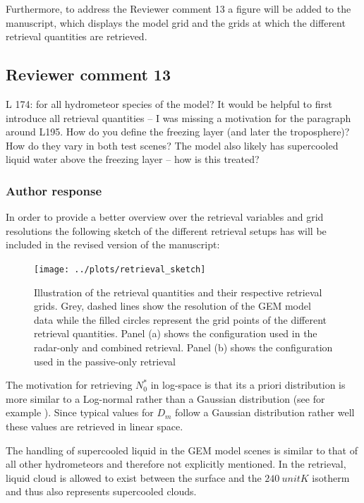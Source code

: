\documentclass[11pt]{scrartcl}
\begin{document}
Furthermore, to address the Reviewer comment 13 a figure will be added to
the manuscript, which displays the model grid and the grids at which
the different retrieval quantities are retrieved.

\subsection*{Reviewer comment 13}

L 174: for all hydrometeor species of the model? It would be helpful to first
introduce all retrieval quantities – I was missing a motivation for the
paragraph around L195. How do you define the freezing layer (and later the
troposphere)? How do they vary in both test scenes? The model also likely has
supercooled liquid water above the freezing layer – how is this treated?

\subsubsection*{Author response}

In order to provide a better overview over the retrieval variables and
grid resolutions the following sketch of the different retrieval setups has
will be included in the revised version of the manuscript:

\begin{figure}
\centering
\texttt{[image: ../plots/retrieval\_sketch]}
\caption{Illustration of the retrieval quantities and their respective retrieval
  grids. Grey, dashed lines show the resolution of the GEM model data while the
  filled circles represent the grid points of the different retrieval
  quantities. Panel (a) shows the configuration used in the radar-only and
  combined retrieval. Panel (b) shows the configuration used in the passive-only
  retrieval}
\label{fig:retrieval_sketch}
\end{figure}

The motivation for retrieving $N_0^*$ in log-space is that its a priori
distribution is more similar to a Log-normal rather than a Gaussian distribution
(see for example \textcite{delanoe15}). Since typical values for $D_m$ follow a
Gaussian distribution rather well these values are retrieved in linear space.

The handling of supercooled liquid in the GEM model scenes is similar to that
of all other hydrometeors and therefore not explicitly mentioned. In the retrieval,
liquid cloud is allowed to exist between the surface and the $240\ unit{K}$ isotherm
and thus also represents supercooled clouds.
\end{document}
